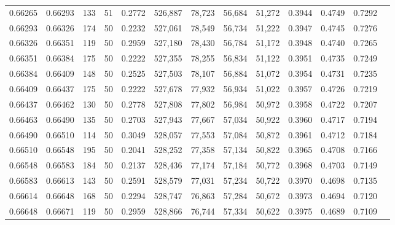 \begin{tabular}{rrrrrrrrrrrrr}
0.66265 & 0.66293 &   133 &  51 &                                     0.2772 & 526,887 &  78,723 &  56,684 &  51,272 & 0.3944 & 0.4749 & 0.7292 \\
0.66293 & 0.66326 &   174 &  50 &                                     0.2232 & 527,061 &  78,549 &  56,734 &  51,222 & 0.3947 & 0.4745 & 0.7276 \\
0.66326 & 0.66351 &   119 &  50 &                                     0.2959 & 527,180 &  78,430 &  56,784 &  51,172 & 0.3948 & 0.4740 & 0.7265 \\
0.66351 & 0.66384 &   175 &  50 &                                     0.2222 & 527,355 &  78,255 &  56,834 &  51,122 & 0.3951 & 0.4735 & 0.7249 \\
0.66384 & 0.66409 &   148 &  50 &                                     0.2525 & 527,503 &  78,107 &  56,884 &  51,072 & 0.3954 & 0.4731 & 0.7235 \\
0.66409 & 0.66437 &   175 &  50 &                                     0.2222 & 527,678 &  77,932 &  56,934 &  51,022 & 0.3957 & 0.4726 & 0.7219 \\
0.66437 & 0.66462 &   130 &  50 &                                     0.2778 & 527,808 &  77,802 &  56,984 &  50,972 & 0.3958 & 0.4722 & 0.7207 \\
0.66463 & 0.66490 &   135 &  50 &                                     0.2703 & 527,943 &  77,667 &  57,034 &  50,922 & 0.3960 & 0.4717 & 0.7194 \\
0.66490 & 0.66510 &   114 &  50 &                                     0.3049 & 528,057 &  77,553 &  57,084 &  50,872 & 0.3961 & 0.4712 & 0.7184 \\
0.66510 & 0.66548 &   195 &  50 &                                     0.2041 & 528,252 &  77,358 &  57,134 &  50,822 & 0.3965 & 0.4708 & 0.7166 \\
0.66548 & 0.66583 &   184 &  50 &                                     0.2137 & 528,436 &  77,174 &  57,184 &  50,772 & 0.3968 & 0.4703 & 0.7149 \\
0.66583 & 0.66613 &   143 &  50 &                                     0.2591 & 528,579 &  77,031 &  57,234 &  50,722 & 0.3970 & 0.4698 & 0.7135 \\
0.66614 & 0.66648 &   168 &  50 &                                     0.2294 & 528,747 &  76,863 &  57,284 &  50,672 & 0.3973 & 0.4694 & 0.7120 \\
0.66648 & 0.66671 &   119 &  50 &                                     0.2959 & 528,866 &  76,744 &  57,334 &  50,622 & 0.3975 & 0.4689 & 0.7109 \\

\end{tabular}

